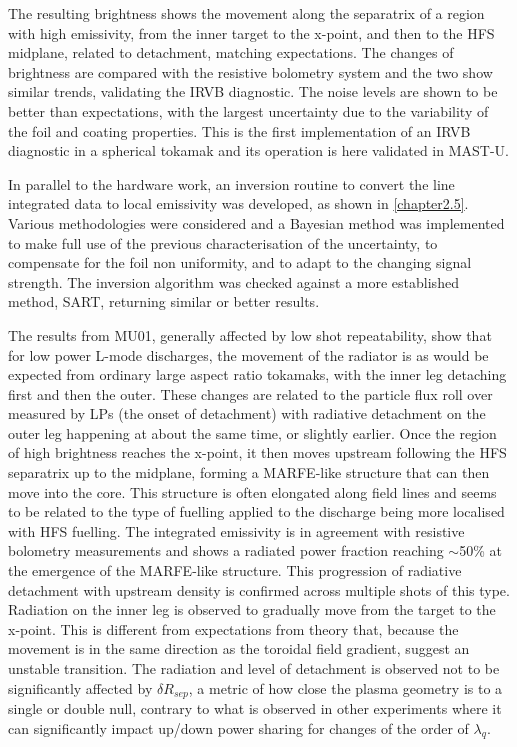 The resulting brightness shows the movement along the separatrix of a region with high emissivity, from the inner target to the x-point, and then to the HFS midplane, related to detachment, matching expectations. The changes of brightness are compared with the resistive bolometry system and the two show similar trends, validating the IRVB diagnostic. The noise levels are shown to be better than expectations, with the largest uncertainty due to the variability of the foil and coating properties. This is the first implementation of an IRVB diagnostic in a spherical tokamak and its operation is here validated in MAST-U.



In parallel to the hardware work, an inversion routine to convert the line integrated data to local emissivity was developed, as shown in \autoref{chapter2.5}. Various methodologies were considered and a Bayesian method was implemented to make full use of the previous characterisation of the uncertainty, to compensate for the foil non uniformity, and to adapt to the changing signal strength. The inversion algorithm was checked against a more established method, SART, returning similar or better results.

The results from MU01, generally affected by low shot repeatability, show that for low power L-mode discharges, the movement of the radiator is as would be expected from ordinary large aspect ratio tokamaks, with the inner leg detaching first and then the outer. These changes are related to the particle flux roll over measured by LPs (the onset of detachment) with radiative detachment on the outer leg happening at about the same time, or slightly earlier. Once the region of high brightness reaches the x-point, it then moves upstream following the HFS separatrix up to the midplane, forming a MARFE-like structure that can then move into the core. This structure is often elongated along field lines and seems to be related to the type of fuelling applied to the discharge being more localised with HFS fuelling. The integrated emissivity is in agreement with resistive bolometry measurements and shows a radiated power fraction reaching $\sim$50\% at the emergence of the MARFE-like structure. This progression of radiative detachment with upstream density is confirmed across multiple shots of this type. Radiation on the inner leg is observed to gradually move from the target to the x-point. This is different from expectations from theory that, because the movement is in the same direction as the toroidal field gradient, suggest an unstable transition. The radiation and level of detachment is observed not to be significantly affected by $\delta R_{sep}$, a metric of how close the plasma geometry is to a single or double null, contrary to what is observed in other experiments where it can significantly impact up/down power sharing for changes of the order of $\lambda_q$.

